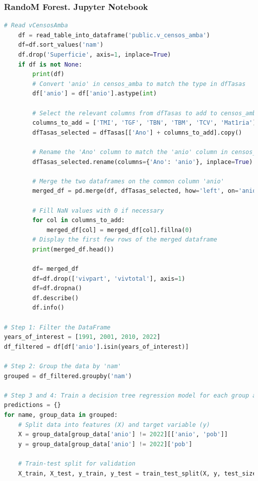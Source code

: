 \documentclass{article}
\theoremstyle{mytheoremstyle}
\theoremstyle{mytheoremstyle}
\theoremstyle{myproblemstyle}
\begin{document}
\subsubsection{RandoM Forest. Jupyter Notebook} 
  \begin{lstlisting}[language=Python, caption=Random Forest.ipynb,label={lst:RANDOMT.ipynb}]
    # Read vCensosAmba
    df = read_table_into_dataframe('public.v_censos_amba')
    df=df.sort_values('nam')
    df.drop('Superficie', axis=1, inplace=True)
    if df is not None:
        print(df)
        # Convert 'anio' in censos_amba to match the type in dfTasas
        df['anio'] = df['anio'].astype(int)
        
        # Select the relevant columns from dfTasas to add to censos_amba
        columns_to_add = ['TMI', 'TGF', 'TBN', 'TBM', 'TCV', 'Mat1ria']
        dfTasas_selected = dfTasas[['Ano'] + columns_to_add].copy()
        
        # Rename the 'Ano' column to match the 'anio' column in censos_amba
        dfTasas_selected.rename(columns={'Ano': 'anio'}, inplace=True)
        
        # Merge the two dataframes on the common column 'anio'
        merged_df = pd.merge(df, dfTasas_selected, how='left', on='anio')
        
        # Fill NaN values with 0 if necessary
        for col in columns_to_add:
            merged_df[col] = merged_df[col].fillna(0)
        # Display the first few rows of the merged dataframe
        print(merged_df.head())   

        df= merged_df
        df=df.drop(['vivpart', 'vivtotal'], axis=1)  
        df=df.dropna()
        df.describe()
        df.info()
        
# Step 1: Filter the DataFrame
years_of_interest = [1991, 2001, 2010, 2022]
df_filtered = df[df['anio'].isin(years_of_interest)]

# Step 2: Group the data by 'nam'
grouped = df_filtered.groupby('nam')

# Step 3 and 4: Train a decision tree regression model for each group and make predictions
predictions = {}
for name, group_data in grouped:
    # Split data into features (X) and target variable (y)
    X = group_data[group_data['anio'] != 2022][['anio', 'pob']]
    y = group_data[group_data['anio'] != 2022]['pob']
    
    # Train-test split for validation
    X_train, X_test, y_train, y_test = train_test_split(X, y, test_size=0.2, random_state=42)
    

\end{lstlisting}
\end{document}
